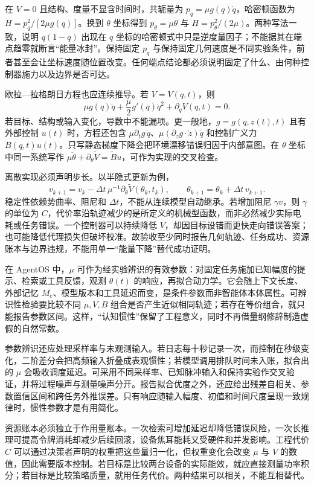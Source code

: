 在 $V=0$ 且结构、度量不显含时间时，共轭量为 $p_q=\mu g(q)\dot q$，哈密顿函数为 $H=p_q^2/[2\mu g(q)]$。换到 $\theta$ 坐标得到 $p_\theta=\mu\dot\theta$ 与 $H=p_\theta^2/(2\mu)$。两种写法一致，说明 $q(1-q)$ 出现在 $q$ 坐标的哈密顿式中只是逆度量因子；不能据其在端点趋零就断言“能量冰封”。保持固定 $p_q$ 与保持固定几何速度是不同实验条件，前者甚至会让坐标速度随位置改变。任何端点结论都必须说明固定了什么、由何种控制器施力以及边界是否可达。

欧拉—拉格朗日方程也应连续推导。若 $V=V(q,t)$，则
\[
\mu g(q)\ddot q+\frac{\mu}{2}g'(q)\dot q^2+\partial_qV(q,t)=0.
\]
若目标、结构或输入变化，导数中不能漏项。更一般地，$g=g(q,z(t),t)$ 且有外部控制 $u(t)$ 时，方程还包含 $\mu\partial_tg\,\dot q$、$\mu(\partial_zg\cdot\dot z)\dot q$ 和控制广义力 $B(q,t)u(t)$。只写静态梯度下降会把环境漂移错误归因于内部意图。在 $\theta$ 坐标中同一系统写作 $\mu\ddot\theta+\partial_\theta\widetilde V=\widetilde B u$，可作为实现的交叉检查。

离散实现必须声明步长。以半隐式更新为例，
\[
v_{k+1}=v_k-\Delta t\,\mu^{-1}\partial_\theta\widetilde V(\theta_k,t_k),\qquad
\theta_{k+1}=\theta_k+\Delta t\,v_{k+1}.
\]
稳定性依赖势曲率、阻尼和 $\Delta t$，不能从连续模型自动继承。若增加阻尼 $\gamma v$，则 $\gamma$ 的单位为 $C$，代价率沿轨迹减少的是所定义的机械型函数，而非必然减少实际电耗或任务错误。一个控制器可以持续降低 $V$，却因目标设错而更快走向错误答案；也可能降低代理损失但破坏校准。故验收至少同时报告几何轨迹、任务成功、资源账本与边界违规，不能用单一“能量下降”替代成功证明。

在 AgentOS 中，$\mu$ 可作为经实验辨识的有效参数：对固定任务施加已知幅度的提示、检索或工具反馈，观测 $\theta(t)$ 的响应，再拟合动力学。它会随上下文长度、外部记忆 $M_e$、模型版本和工具延迟而变，是条件参数而非智能体本体属性。可辨识性检验要比较不同 $\mu,V,B$ 组合是否产生近似相同轨迹；若存在等价组合，就只能报告参数区间。这样，“认知惯性”保留了工程意义，同时不再借量纲修辞制造虚假的自然常数。

参数辨识还应处理采样率与未观测输入。若日志每十秒记录一次，而控制在秒级变化，二阶差分会把高频输入折叠成表观惯性；若模型调用排队时间未入账，拟合出的 $\mu$ 会吸收调度延迟。可采用不同采样率、已知脉冲输入和保持实验作交叉验证，并将过程噪声与测量噪声分开。报告拟合优度之外，还应给出残差自相关、参数置信区间和跨任务外推误差。只有响应随输入幅度、初值和时间尺度呈现一致规律时，惯性参数才是有用简化。

资源账本必须独立于作用量账本。一次检索可增加延迟却降低错误风险，一次长推理可提高令牌消耗却减少后续回滚，设备焦耳能耗又受硬件和并发影响。工程代价 $C$ 可以通过决策者声明的权重把这些量归一化，但权重变化会改变 $\mu$ 与 $V$ 的数值，因此需要版本控制。若目标是比较两台设备的实际能效，就应直接测量功率积分；若目标是比较策略质量，就用任务代价。两种结果可以相关，不能互相替代。

